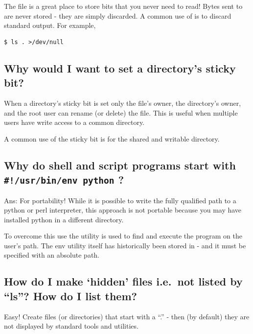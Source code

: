 The file  is a great place to store bits that you never need to read! Bytes sent to  are never stored - they are simply discarded. A common use of  is to discard standard output. For example,

\begin{lstlisting}
$ ls . >/dev/null
\end{lstlisting}

\subsection{Why would I want to set a directory's sticky bit?}\label{why-would-i-want-to-set-a-directorys-sticky-bit}

When a directory's sticky bit is set only the file's owner, the directory's owner, and the root user can rename (or delete) the file. This is useful when multiple users have write access to a common directory.

A common use of the sticky bit is for the shared and writable  directory.

\subsection{\texorpdfstring{Why do shell and script programs start with \texttt{\#!/usr/bin/env\ python} ?}{Why do shell and script programs start with \#!/usr/bin/env python ?}}\label{why-do-shell-and-script-programs-start-with-usrbinenv-python}

Ans: For portability! While it is possible to write the fully qualified path to a python or perl interpreter, this approach is not portable because you may have installed python in a different directory.

To overcome this use the  utility is used to find and execute the program on the user's path. The env utility itself has historically been stored in  - and it must be specified with an absolute path.

\subsection{\texorpdfstring{How do I make `hidden' files i.e.~not listed by ``ls''? How do I list them?}{How do I make hidden files i.e.~not listed by ls? How do I list them?}}\label{how-do-i-make-hidden-files-i.e.not-listed-by-ls-how-do-i-list-them}

Easy! Create files (or directories) that start with a ``.'' - then (by default) they are not displayed by standard tools and utilities.

